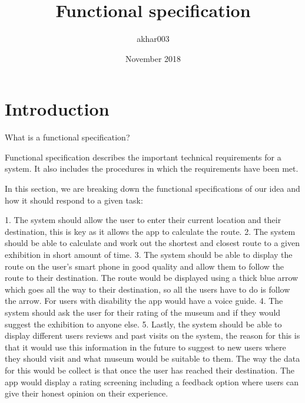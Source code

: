 \documentclass{article}
\title{Functional specification}
\author{akhar003 }
\date{November 2018}
\begin{document}
\maketitle

\section{Introduction}
What is a functional specification?

Functional specification describes the important technical requirements for a system. It also includes the procedures in which the requirements have been met.

In this section, we are breaking down the functional specifications of our idea and how it should respond to a given task:

1.	The system should allow the user to enter their current location and their destination, this is key as it allows the app to calculate the route.
2.	The system should be able to calculate and work out the shortest and closest route to a given exhibition in short amount of time.
3.	The system should be able to display the route on the user’s smart phone in good quality and allow them to follow the route to their destination. The route would be displayed using a thick blue arrow which goes all the way to their destination, so all the users have to do is follow the arrow. For users with disability the app would have a voice guide.
4.	The system should ask the user for their rating of the museum and if they would suggest the exhibition to anyone else.
5.	Lastly, the system should be able to display different users reviews and past visits on the system, the reason for this is that it would use this information in the future to suggest to new users where they should visit and what museum would be suitable to them. The way the data for this would be collect is that once the user has reached their destination. The app would display a rating screening including a feedback option where users can give their honest opinion on their experience. 
\end{document}
